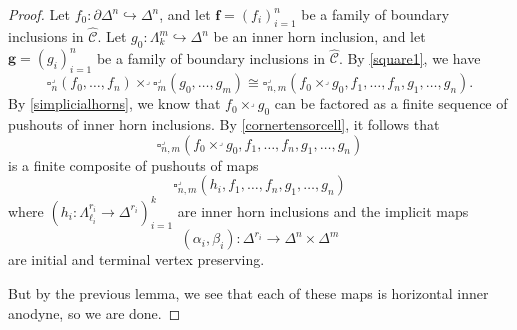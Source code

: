 \documentclass[leqno]{article}
\numberwithin{equation}{subsection}
\theoremstyle{plain}   %
\theoremstyle{remark}
\theoremstyle{plain}
\newcommand{\psh}[1]{\ensuremath{\widehat{#1}}}
\providecommand{\C}{}
\renewcommand{\C}{\ensuremath{\mathcal{C}}}
\begin{document}
\begin{proof}
	Let \(f_0:\partial\Delta^n \hookrightarrow \Delta^n\), and let \(\mathbf{f}=(f_i)_{i=1}^n\) be a family of boundary inclusions in \(\psh{\C}\).  Let \(g_0:\Lambda^m_k \hookrightarrow \Delta^n\) be an inner horn inclusion, and let \(\mathbf{g}=(g_i)_{i=1}^n\) be a family of boundary inclusions in \(\psh{\C}\).  By \ref{square1}, we have 
	\[
		\square^\lrcorner_n(f_0,\dots,f_n) \times^\lrcorner \square^\lrcorner_m(g_0,\dots,g_m) \cong \square^\lrcorner_{n,m}(f_0 \times^\lrcorner g_0, f_1,\dots,f_n,g_1,\dots,g_n).
	\]
	By \ref{simplicialhorns}, we know that \(f_0\times^\lrcorner g_0\) can be factored as a finite sequence of pushouts of inner horn inclusions.  By \ref{cornertensorcell}, it follows that
	\[
		\square^\lrcorner_{n,m}(f_0 \times^\lrcorner g_0, f_1,\dots,f_n,g_1,\dots,g_n)
	\]
	is a finite composite of pushouts of maps
	\[
		\square^\lrcorner_{n,m}(h_i, f_1,\dots,f_n,g_1,\dots,g_n)
	\] 
	where \((h_i:\Lambda^{r_i}_{\ell_i} \to \Delta^{r_i})_{i=1}^k\) are inner horn inclusions and the implicit maps 
	\[
		(\alpha_i,\beta_i):\Delta^{r_i}\to \Delta^n\times \Delta^m
	\]
	are initial and terminal vertex preserving. 

	But by the previous lemma, we see that each of these maps is horizontal inner anodyne, so we are done.
	\begin{comment}
		Then by \ref{square2}, we see that 
		\[\square^\lrcorner_{n,m}(h_i,\mathbf{f},\mathbf{g}) \cong \square^\lrcorner_{r_i}(h^\prime_i, (P_1^\lrcorner,\dots, P_{r_i}^\lrcorner)	 	\circ \tau(\mathbf{f},\mathbf{g})).\]
		But the value of the argument in position \(1\leq j \leq r_i\) is 
		\[P_j^\lrcorner\circ \tau_j(\mathbf{f},\mathbf{g})=f_{\alpha_i(j-1)+1}\times^\lrcorner \dots \times^\lrcorner f_{\alpha_i(j)} 		\times^\lrcorner g_{\beta_i(j-1)+1}\times \dots^\lrcorner \times^\lrcorner g_{\beta_i(j)},\]
		which belongs to \(\operatorname{Cell}(\mathscr{B})\), where \(\mathscr{B}\) is the set of boundary inclusions in \(\psh{\C}\).  So we 	see 	that
		\[\square^\lrcorner_{r_i}(h^\prime_i, (P_1^\lrcorner,\dots, P_{r_i}^\lrcorner \circ \tau)(\mathbf{f},\mathbf{g}))\] is in 
		\[\{\square^\lrcorner_{r_i}(\mathscr{L}, \operatorname{Cell}(\mathscr{B}), \dots, \operatorname{Cell}(\mathscr{B}))\},\]
		where \(\mathscr{L}\) is the set of inner horn inclusions, which by \ref{cornertensorcell} is a subset of 
		\[\operatorname{Cell}(\{\square^\lrcorner_{r_i}(\mathscr{L},\mathscr{B},\dots,\mathscr{B})\}),\]
		which belongs to \(\operatorname{Cell}(\mathscr{J}),\) since \(\{\square^\lrcorner_{r_i}(\mathscr{L},\mathscr{B},\dots,\mathscr{B})\}		\subseteq \mathscr{J}\).
	\end{comment}
\end{proof}
\end{document}
